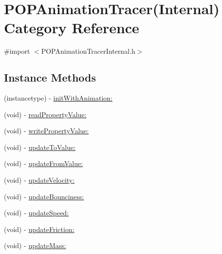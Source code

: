 \hypertarget{category_p_o_p_animation_tracer_07_internal_08}{}\section{P\+O\+P\+Animation\+Tracer(Internal) Category Reference}
\label{category_p_o_p_animation_tracer_07_internal_08}


{\ttfamily \#import $<$P\+O\+P\+Animation\+Tracer\+Internal.\+h$>$}

\subsection*{Instance Methods}
\begin{DoxyCompactItemize}
\item 
(instancetype) -\/ \mbox{\hyperlink{category_p_o_p_animation_tracer_07_internal_08_a172bb65bdc4887fc5bfe4bcd38e5a5e8}{init\+With\+Animation\+:}}
\item 
(void) -\/ \mbox{\hyperlink{category_p_o_p_animation_tracer_07_internal_08_a219ed8a35e2d3fa997e5688386572f15}{read\+Property\+Value\+:}}
\item 
(void) -\/ \mbox{\hyperlink{category_p_o_p_animation_tracer_07_internal_08_aa703f72cf374b9f6feb44c0fe8d508d9}{write\+Property\+Value\+:}}
\item 
(void) -\/ \mbox{\hyperlink{category_p_o_p_animation_tracer_07_internal_08_a00d4c0e1b6b446081cfb6c153f37a633}{update\+To\+Value\+:}}
\item 
(void) -\/ \mbox{\hyperlink{category_p_o_p_animation_tracer_07_internal_08_aa5cc867da95a73d3254f38a86281233a}{update\+From\+Value\+:}}
\item 
(void) -\/ \mbox{\hyperlink{category_p_o_p_animation_tracer_07_internal_08_ab828c06696377e94ba3bdd490b5cd146}{update\+Velocity\+:}}
\item 
(void) -\/ \mbox{\hyperlink{category_p_o_p_animation_tracer_07_internal_08_a61998b16b4eb5df6d11dbd0bd269339c}{update\+Bounciness\+:}}
\item 
(void) -\/ \mbox{\hyperlink{category_p_o_p_animation_tracer_07_internal_08_a7f31ab4b95f8d9409a77b78bf7b8af1d}{update\+Speed\+:}}
\item 
(void) -\/ \mbox{\hyperlink{category_p_o_p_animation_tracer_07_internal_08_aba012bff58a203420d1adf3e922491e0}{update\+Friction\+:}}
\item 
(void) -\/ \mbox{\hyperlink{category_p_o_p_animation_tracer_07_internal_08_a1e41c2f1b7c5332730d2c834e0420367}{update\+Mass\+:}}

\end{DoxyCompactItemize}
